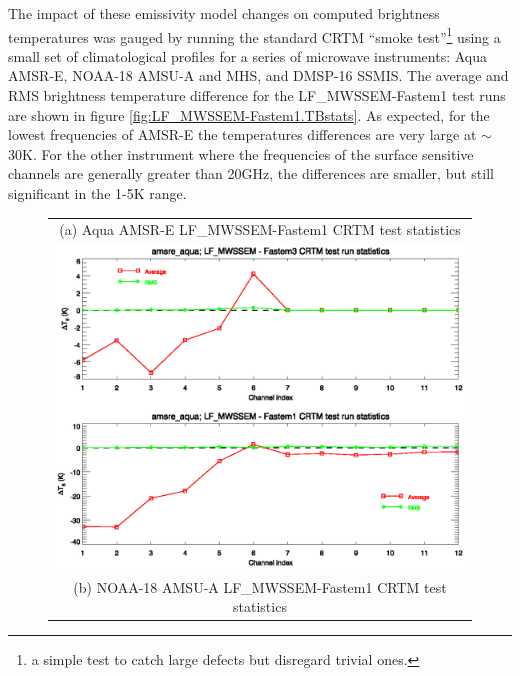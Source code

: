 The impact of these emissivity model changes on computed brightness temperatures was gauged by running the standard CRTM ``smoke test''\footnote{a simple test to catch large defects but disregard trivial ones.} using a small set of climatological profiles for a series of microwave instruments: Aqua AMSR-E, NOAA-18 AMSU-A and MHS, and DMSP-16 SSMIS. The average and RMS brightness temperature difference for the LF\_MWSSEM-Fastem1 test runs are shown in figure \ref{fig:LF_MWSSEM-Fastem1.TBstats}. As expected, for the lowest frequencies of AMSR-E the temperatures differences are very large at $\sim$30K. For the other instrument where the frequencies of the surface sensitive channels are generally greater than 20GHz, the differences are smaller, but still significant in the 1-5K range.

\begin{figure}[htp]
  \centering
  \begin{tabular}{c}
    \textsf{(a) Aqua AMSR-E LF\_MWSSEM-Fastem1 CRTM test statistics}\\
    \includegraphics[bb=85 225 540 380,clip,scale=0.8]{graphics/Comparison/amsre_aqua.TBstats.eps}\\
    \textsf{(b) NOAA-18 AMSU-A LF\_MWSSEM-Fastem1 CRTM test statistics}\\

\end{tabular}
\end{figure}

